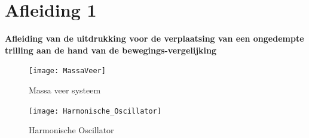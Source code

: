 \documentclass[a4paper,kul]{kulakarticle} %
\begin{document}
\section{Afleiding 1}

\textbf{Afleiding van de uitdrukking voor de verplaatsing van een ongedempte trilling aan de hand van de bewegings-vergelijking}\\
\begin{figure}[htbp]
	\centering
	\texttt{[image: MassaVeer]}
	\caption[Massa veer systeem]{Massa veer systeem}
	\label{fig:massaveer}
\end{figure}
\begin{figure}[htbp]
	\centering
	\texttt{[image: Harmonische\_Oscillator]}
	\caption[Harmonische Oscillator]{Harmonische Oscillator}
	\label{fig:harmonischeoscilator}%
\end{figure}
\end{document}
